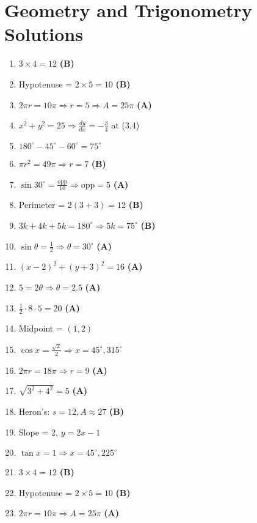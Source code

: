 \documentclass[12pt]{article}
\begin{document}
\section{Geometry and Trigonometry Solutions}
\begin{enumerate}[label=\textbf{Question \arabic*:}]
  \item \( 3 \times 4 = 12 \) \textbf{(B)}
  \item Hypotenuse = \( 2 \times 5 = 10 \) \textbf{(B)}
  \item \( 2\pi r = 10\pi \Rightarrow r = 5 \Rightarrow A = 25\pi \) \textbf{(A)}
  \item \( x^2 + y^2 = 25 \Rightarrow \frac{dy}{dx} = -\frac{3}{4} \) at (3,4)
  \item \( 180^\circ - 45^\circ - 60^\circ = 75^\circ \)
  \item \( \pi r^2 = 49\pi \Rightarrow r = 7 \) \textbf{(B)}
  \item \( \sin 30^\circ = \frac{\text{opp}}{10} \Rightarrow \text{opp} = 5 \) \textbf{(A)}
  \item Perimeter = \( 2(3 + 3) = 12 \) \textbf{(B)}
  \item \( 3k + 4k + 5k = 180^\circ \Rightarrow 5k = 75^\circ \) \textbf{(B)}
  \item \( \sin \theta = \frac{1}{2} \Rightarrow \theta = 30^\circ \) \textbf{(A)}
  \item \( (x - 2)^2 + (y + 3)^2 = 16 \) \textbf{(A)}
  \item \( 5 = 2\theta \Rightarrow \theta = 2.5 \) \textbf{(A)}
  \item \( \frac{1}{2} \cdot 8 \cdot 5 = 20 \) \textbf{(A)}
  \item Midpoint = \( (1, 2) \)
  \item \( \cos x = \frac{\sqrt{2}}{2} \Rightarrow x = 45^\circ, 315^\circ \)
  \item \( 2\pi r = 18\pi \Rightarrow r = 9 \) \textbf{(A)}
  \item \( \sqrt{3^2 + 4^2} = 5 \) \textbf{(A)}
  \item Heron’s: \( s = 12, A \approx 27 \) \textbf{(B)}
  \item Slope = 2, \( y = 2x - 1 \)
  \item \( \tan x = 1 \Rightarrow x = 45^\circ, 225^\circ \)
  \item \( 3 \times 4 = 12 \) \textbf{(B)}
  \item Hypotenuse = \( 2 \times 5 = 10 \) \textbf{(B)}
  \item \( 2\pi r = 10\pi \Rightarrow A = 25\pi \) \textbf{(A)}

\end{enumerate}
\end{document}

